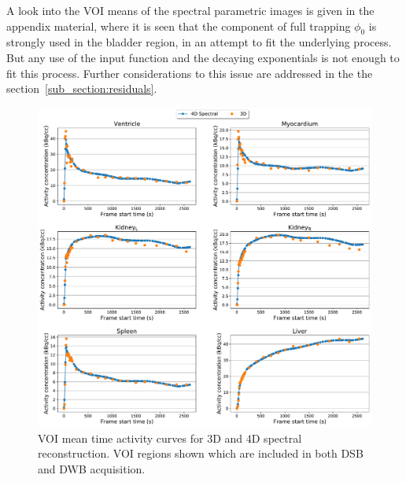 A look into the VOI means of the spectral parametric images is given in the appendix material, where it is seen that the component of full trapping $\phi_0$ is strongly used in the bladder region, in an attempt to fit the underlying process. But any use of the input function and the decaying exponentials is not enough to fit this process. Further considerations to this issue are addressed in the the section~\ref{sub_section:residuals}. 

\begin{figure} [h!]
\centering
\includegraphics[scale=0.5,angle=0]{3_Results/3_3_DWB_Reconstruction/figures/3_3_IsotoPK_CTRL_DWB_3D_vs_4D_central.pdf}
\caption{VOI mean time activity curves for 3D and 4D spectral reconstruction. VOI regions shown which are included in both DSB and DWB acquisition.}
\label{fig_3_3:IsotoPK_CTRL_DWB_4D_vs_3D_Central}
\end{figure}

